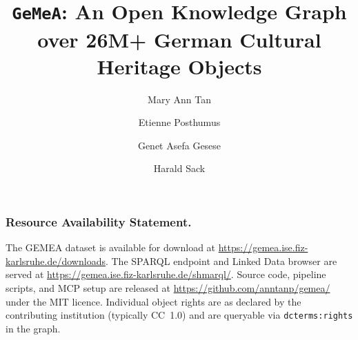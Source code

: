 \documentclass[runningheads]{llncs}
\begin{document}
%
\title{{\texttt{GeMeA}: An Open Knowledge Graph over 26M+ German Cultural Heritage Objects}}
%
%
\author{Mary Ann Tan \and
Etienne Posthumus \and
Genet Asefa Gesese \and
Harald Sack}
%
%
%
\maketitle              %
%
\begin{abstract}

\end{abstract}
%
%
%









\subsubsection*{Resource Availability Statement.}
\begin{sloppypar}
The GEMEA dataset is available for download at
\url{https://gemea.ise.fiz-karlsruhe.de/downloads}. %
The SPARQL endpoint and Linked Data browser are served at
\url{https://gemea.ise.fiz-karlsruhe.de/shmarql/}.
Source code, pipeline scripts, and MCP setup are released at \url{https://github.com/anntanp/gemea/} under the MIT licence.
Individual object rights are as declared by the contributing institution
(typically CC~1.0) and are queryable via \texttt{dcterms:rights} in the graph.
\end{sloppypar}
\end{document}
